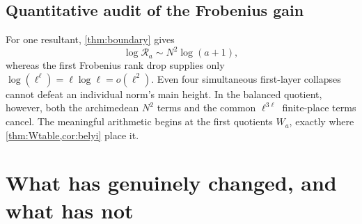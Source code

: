 \documentclass[11pt]{article}
\theoremstyle{definition}
\theoremstyle{remark}
\begin{document}
\subsection{Quantitative audit of the Frobenius gain}
For one resultant, \cref{thm:boundary} gives
\[
\log\mathscr R_a\sim N^2\log(a+1),
\]
whereas the first Frobenius rank drop supplies only
\(\log(\ell^\ell)=\ell\log\ell=o(\ell^2)\).  Even four simultaneous first-layer collapses cannot defeat an individual norm's main height.  In the balanced quotient, however, both the archimedean \(N^2\) terms and the common \(\ell^{3\ell}\) finite-place terms cancel.  The meaningful arithmetic begins at the first quotients \(W_a\), exactly where \cref{thm:Wtable,cor:belyi} place it.

\section{What has genuinely changed, and what has not}\label{sec:audit}
\end{document}
